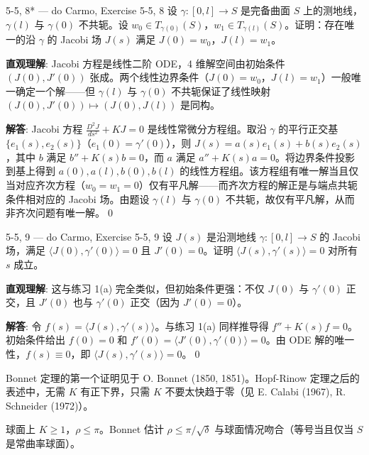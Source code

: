 \begin{exercise}{5-5, 8* — do Carmo, Exercise 5-5, 8}
设 $\gamma: [0,l] \to S$ 是完备曲面 $S$ 上的测地线，$\gamma(l)$ 与 $\gamma(0)$ 不共轭。设 $w_0 \in T_{\gamma(0)}(S)$，$w_1 \in T_{\gamma(l)}(S)$。证明：存在唯一的沿 $\gamma$ 的 Jacobi 场 $J(s)$ 满足 $J(0)=w_0$，$J(l)=w_1$。
\end{exercise}
\begin{solution}
\textbf{直观理解}: Jacobi 方程是线性二阶 ODE，4 维解空间由初始条件 $(J(0),J'(0))$ 张成。两个线性边界条件（$J(0)=w_0$，$J(l)=w_1$）一般唯一确定一个解——但 $\gamma(l)$ 与 $\gamma(0)$ 不共轭保证了线性映射 $(J(0),J'(0))\mapsto (J(0),J(l))$ 是同构。

\textbf{解答}: Jacobi 方程 $\frac{D^2J}{ds^2}+KJ=0$ 是线性常微分方程组。取沿 $\gamma$ 的平行正交基 $\{e_1(s),e_2(s)\}$（$e_1(0)=\gamma'(0)$），则 $J(s)=a(s)e_1(s)+b(s)e_2(s)$，其中 $b$ 满足 $b''+K(s)b=0$，而 $a$ 满足 $a''+K(s)a=0$。将边界条件投影到基上得到 $a(0),a(l),b(0),b(l)$ 的线性方程组。该方程组有唯一解当且仅当对应齐次方程（$w_0=w_1=0$）仅有平凡解——而齐次方程的解正是与端点共轭条件相对应的 Jacobi 场。由题设 $\gamma(l)$ 与 $\gamma(0)$ 不共轭，故仅有平凡解，从而非齐次问题有唯一解。\qed
\end{solution}

\begin{exercise}{5-5, 9 — do Carmo, Exercise 5-5, 9}
设 $J(s)$ 是沿测地线 $\gamma: [0,l] \to S$ 的 Jacobi 场，满足 $\langle J(0),\gamma'(0)\rangle = 0$ 且 $J'(0)=0$。证明 $\langle J(s),\gamma'(s)\rangle = 0$ 对所有 $s$ 成立。
\end{exercise}
\begin{solution}
\textbf{直观理解}: 这与练习 1(a) 完全类似，但初始条件更强：不仅 $J(0)$ 与 $\gamma'(0)$ 正交，且 $J'(0)$ 也与 $\gamma'(0)$ 正交（因为 $J'(0)=0$）。

\textbf{解答}: 令 $f(s)=\langle J(s),\gamma'(s)\rangle$。与练习 1(a) 同样推导得 $f''+K(s)f=0$。初始条件给出 $f(0)=0$ 和 $f'(0)=\langle J'(0),\gamma'(0)\rangle=0$。由 ODE 解的唯一性，$f(s)\equiv 0$，即 $\langle J(s),\gamma'(s)\rangle=0$。\qed
\end{solution}

\begin{Remark}
Bonnet 定理的第一个证明见于 O. Bonnet (1850, 1851)。Hopf-Rinow 定理之后的表述中，无需 $K$ 有正下界，只需 $K$ 不要太快趋于零（见 E. Calabi (1967), R. Schneider (1972)）。
\end{Remark}

\begin{Remark}
球面上 $K \geq 1$，$\rho \leq \pi$。Bonnet 估计 $\rho \leq \pi/\sqrt{\delta}$ 与球面情况吻合（等号当且仅当 $S$ 是常曲率球面）。
\end{Remark}

